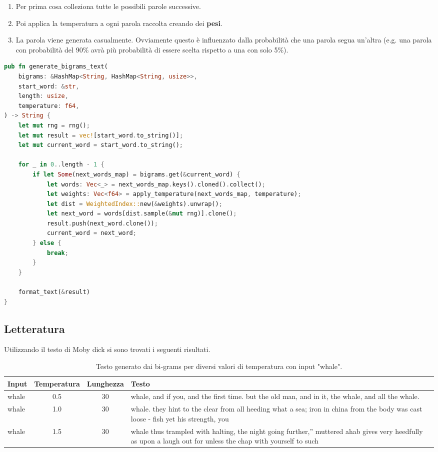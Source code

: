 \begin{enumerate}
  \item Per prima cosa colleziona tutte le possibili parole successive. 
  \item Poi applica la temperatura a ogni parola raccolta creando dei \textbf{pesi}. 
  \item La parola viene generata casualmente. Ovviamente questo è influenzato dalla probabilità che una parola segua un'altra (e.g. una parola con probabilità del 90\% avrà più probabilità di essere scelta rispetto a una con solo 5\%).
\end{enumerate}

\begin{lstlisting}[language=rust, caption = Generazione dei bi-grams]
pub fn generate_bigrams_text(
    bigrams: &HashMap<String, HashMap<String, usize>>,
    start_word: &str,
    length: usize,
    temperature: f64,
) -> String {
    let mut rng = rng();
    let mut result = vec![start_word.to_string()];
    let mut current_word = start_word.to_string();

    for _ in 0..length - 1 {
        if let Some(next_words_map) = bigrams.get(&current_word) {
            let words: Vec<_> = next_words_map.keys().cloned().collect();
            let weights: Vec<f64> = apply_temperature(next_words_map, temperature);
            let dist = WeightedIndex::new(&weights).unwrap();
            let next_word = words[dist.sample(&mut rng)].clone();
            result.push(next_word.clone());
            current_word = next_word;
        } else {
            break;
        }
    }

    format_text(&result)
}\end{lstlisting}

\subsection{Letteratura}

Utilizzando il testo di Moby dick si sono trovati i seguenti risultati. 

\begin{table}[h!]
\centering
\begin{tabular}{|l|c|c|p{8cm}|}
\hline
\textbf{Input} & \textbf{Temperatura} & \textbf{Lunghezza} & \textbf{Testo} \\
\hline
whale & 0.5 & 30 & whale, and if you, and the first time. but the old man, and in it, the whale, and all the whale. \\
\hline
whale & 1.0 & 30 & whale. they hint to the clear from all heeding what a sea; iron in china from the body was cast loose - fish yet his strength, you \\
\hline
whale & 1.5 & 30 & whale thus trampled with halting, the night going further,” muttered ahab gives very heedfully as upon a laugh out for unless the chap with yourself to such \\
\hline
\end{tabular}
\caption{Testo generato dai bi-grams per diversi valori di temperatura con input "whale".}
\end{table}

